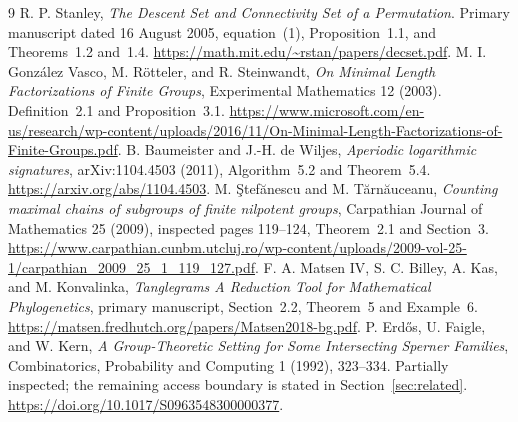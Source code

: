 \documentclass[11pt,letterpaper]{article}
\theoremstyle{definition}\newtheorem{definition}{Definition}
\begin{document}
\begin{thebibliography}{9}
 R. P. Stanley, \emph{The Descent Set and Connectivity Set of a Permutation}. Primary manuscript dated 16 August 2005, equation~(1), Proposition~1.1, and Theorems~1.2 and~1.4. \url{https://math.mit.edu/~rstan/papers/decset.pdf}.
 M. I. Gonz\'alez Vasco, M. R\"otteler, and R. Steinwandt, \emph{On Minimal Length Factorizations of Finite Groups}, Experimental Mathematics 12 (2003). Definition~2.1 and Proposition~3.1. \url{https://www.microsoft.com/en-us/research/wp-content/uploads/2016/11/On-Minimal-Length-Factorizations-of-Finite-Groups.pdf}.
 B. Baumeister and J.-H. de Wiljes, \emph{Aperiodic logarithmic signatures}, arXiv:1104.4503 (2011), Algorithm~5.2 and Theorem~5.4. \url{https://arxiv.org/abs/1104.4503}.
 M. \c{S}tef\u{a}nescu and M. T\u{a}rn\u{a}uceanu, \emph{Counting maximal chains of subgroups of finite nilpotent groups}, Carpathian Journal of Mathematics 25 (2009), inspected pages 119--124, Theorem~2.1 and Section~3. \url{https://www.carpathian.cunbm.utcluj.ro/wp-content/uploads/2009-vol-25-1/carpathian_2009_25_1_119_127.pdf}.
 F. A. Matsen IV, S. C. Billey, A. Kas, and M. Konvalinka, \emph{Tanglegrams A Reduction Tool for Mathematical Phylogenetics}, primary manuscript, Section~2.2, Theorem~5 and Example~6. \url{https://matsen.fredhutch.org/papers/Matsen2018-bg.pdf}.
 P. Erd\H{o}s, U. Faigle, and W. Kern, \emph{A Group-Theoretic Setting for Some Intersecting Sperner Families}, Combinatorics, Probability and Computing 1 (1992), 323--334. Partially inspected; the remaining access boundary is stated in Section~\ref{sec:related}. \url{https://doi.org/10.1017/S0963548300000377}.
\end{thebibliography}
\end{document}
